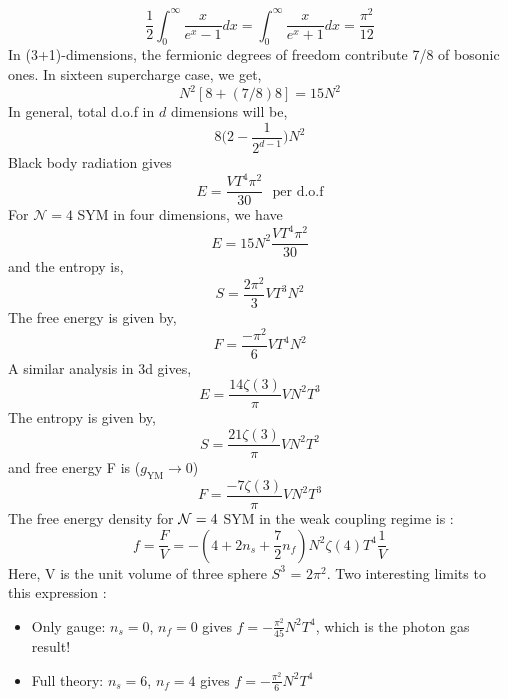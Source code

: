 \begin{equation}
    \frac{1}{2}\int_{0}^{\infty} \frac{x}{e^{x} -1} dx = 
    \int_{0}^{\infty} \frac{x}{e^{x}+1} dx = \frac{\pi^2}{12}
\end{equation}
In (3+1)-dimensions, the fermionic degrees of freedom contribute 7/8 of bosonic ones. In sixteen supercharge case, 
we get,  
\begin{equation}
N^2 \left[ 8 + (7/8)8 \right] = 15N^2
\end{equation}
In general, total d.o.f in $d$ dimensions will be, 
\begin{equation}
8 \Big( 2 - \frac{1}{2^{d-1}}\Big) N^2
\end{equation}
Black body radiation gives 
\begin{equation} 
E = \frac{VT^4 \pi^2}{30} ~~~\text{per d.o.f}
\end{equation} 
For $\mathcal{N}=4$ SYM in four dimensions, we have 
\begin{equation} 
E = 15N^2 \frac{VT^4 \pi^2}{30} 
\end{equation} 
and the entropy is,  
\begin{equation} 
S = \frac{2\pi^2}{3} VT^3N^2 
\end{equation} 
The free energy is given by, 
\begin{equation}
F = \frac{-\pi^2}{6} VT^4N^2 
\end{equation} 
A similar analysis in 3d gives, 
\begin{equation}
E =  \frac{14\zeta(3)}{\pi}VN^2T^3 
\end{equation} 
The entropy is given by,  
\begin{equation}
S = \frac{21\zeta(3)}{\pi}VN^2T^2
\end{equation} 
and free energy F is ($g_{\text{YM}} \to 0$) 
\begin{equation}
F = \frac{-7\zeta(3)}{\pi}VN^2T^3
\end{equation} 
The free energy density for ${\cal N}=4$  SYM in the weak coupling regime is :
\begin{equation}
    f = \frac{F}{V} = - \left(4 + 2n_{s} + \frac{7}{2} n_{f}\right) N^{2} \zeta(4) T^{4} \frac{1}{V} 
\end{equation}
Here, V is the unit volume of three sphere $S^{3}$ = $2\pi^2$. 
Two interesting limits to this expression :
\begin{itemize}
\item Only gauge: $n_{s} = 0$, $n_{f} = 0$ gives $f = - \frac{\pi^2}{45} N^{2}T^{4}$, which is the photon gas result! 
\item Full theory: $n_{s} = 6$, $n_{f} = 4$ gives $f = - \frac{\pi^2}{6} N^{2}T^{4}$
\end{itemize}

